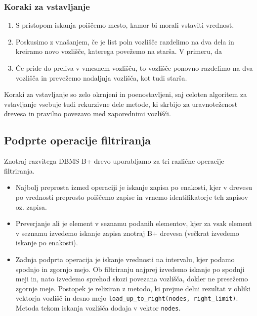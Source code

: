 \documentclass[a4paper,12pt,openright]{book}
\begin{document}
        \subsubsection{Koraki za vstavljanje}

        \begin{enumerate}
            \item S pristopom iskanja poiščemo mesto, kamor bi morali vstaviti vrednost.
            \item Poskusimo z vnašanjem, če je list poln vozlišče razdelimo na dva dela in kreiramo novo vozlišče, katerega povežemo na starša. V primeru, da 
            \item Če pride do preliva v vmesnem vozlišču, to vozlišče ponovno razdelimo na dva vozlišča in prevežemo nadaljnja vozlišča, kot tudi starša.
        \end{enumerate}

        \noindent
        Koraki za vstavljanje so zelo okrnjeni in poenostavljeni, saj celoten algoritem za vstavljanje vsebuje tudi rekurzivne dele metode, ki skrbijo za uravnoteženost drevesa in pravilno povezavo med zaporednimi vozlišči.

        \subsection{Podprte operacije filtriranja}
        
        Znotraj razvitega DBMS B+ drevo uporabljamo za tri različne operacije filtriranja.
        \begin{itemize}
            \item Najbolj preprosta izmed operaciji je iskanje zapisa po enakosti, kjer v drevesu po vrednosti preprosto poiščemo zapise in vrnemo identifikatorje teh zapisov oz. zapisa.
            \item Preverjanje ali je element v seznamu podanih elementov, kjer za vsak element v seznamu izvedemo iskanje zapisa znotraj B+ drevesa (večkrat izvedemo iskanje po enakosti).
            \item Zadnja podprta operacija je iskanje vrednosti na intervalu, kjer podamo spodnjo in zgornjo mejo. Ob filtriranju najprej izvedemo iskanje po spodnji meji in, nato izvedemo sprehod skozi povezana vozlišča, dokler ne presežemo zgornje meje. Postopek je reliziran z metodo, ki prejme delni rezultat v obliki vektorja vozlišč in desno mejo {\tt load\_up\_to\_right(nodes, right\_limit)}. Metoda tekom iskanja vozlišča dodaja v vektor {\tt nodes}.
        \end{itemize}
\end{document}
